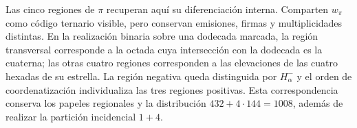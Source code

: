 Las cinco regiones de $\pi$ recuperan aquí su diferenciación interna.
Comparten $w_\pi$ como código ternario visible, pero conservan emisiones,
firmas y multiplicidades distintas. En la realización binaria sobre una
dodecada marcada, la región transversal corresponde a la octada cuya
intersección con la dodecada es la cuaterna; las otras cuatro regiones
corresponden a las elevaciones de las cuatro hexadas de su estrella. La
región negativa queda distinguida por $H^-_\alpha$ y el orden de coordenatización
individualiza las tres regiones positivas. Esta correspondencia conserva
los papeles regionales y la distribución $432+4\cdot144=1008$, además
de realizar la partición incidencial $1+4$.
